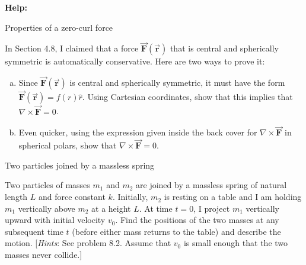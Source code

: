 \documentclass[11pt,letterpaper,boxed]{../hmcpsetrhino}
\let\oldvec\vec
\renewcommand{\vec}[1]{\oldvec{\mathbf{#1}}}
\begin{document}
\textbf{Help:} 

\begin{problem}[i]
Properties of a zero-curl force\\
\begin{problem}[4.43]
In Section 4.8, I claimed that a force $\vec F(\vec r)$ that is central and spherically symmetric is automatically conservative. Here are two ways to prove it:
\begin{enumerate}[(a)]
\item Since $\vec F (\vec r)$ is central and spherically symmetric, it must have the form $\vec F(\vec r) = f(r) \hat r$. Using Cartesian coordinates, show that this implies that $\nabla \times \vec F = 0$.
\item Even quicker, using the expression given inside the back cover for $\nabla \times \vec F$ in spherical polars, show that $\nabla \times \vec F = 0$.
\end{enumerate}
\end{problem}
\vspace{-0.45cm}
\end{problem}
\begin{solution}


\vfill
\end{solution}

\newpage 

\begin{problem}[ii]
Two particles joined by a massless spring\\
\begin{problem}[8.3]
Two particles of masses $m_1$ and $m_2$ are joined by a massless spring of natural length $L$ and force constant $k$. Initially, $m_2$ is resting on a table and I am holding $m_1$ vertically above $m_2$ at a height $L$. At time $t=0$, I project $m_1$ vertically upward with initial velocity $v_0$. Find the positions of the two masses at any subsequent time $t$ (before either mass returns to the table) and describe the motion. [\textit{Hints}: See problem 8.2. Assume that $v_0$ is small enough that the two masses never collide.]
\end{problem}
\vspace{-0.45cm}
\end{problem}
\begin{solution}


\vfill
\end{solution}


\newpage
\end{document}
